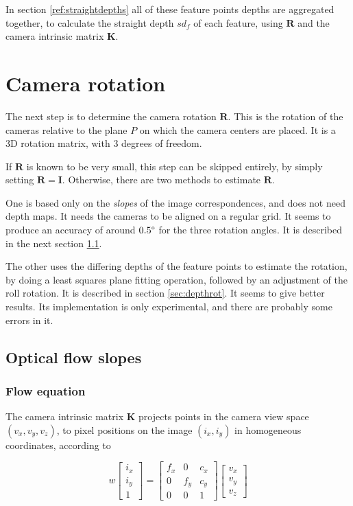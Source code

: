\documentclass{scrreprt}
\newcommand{\matr}[1]{\mathbf{#1}}
\newcommand{\degr}{\text{\textdegree}}
\begin{document}
In section \ref{ref:straightdepths} all of these feature points depths are aggregated together, to calculate the straight depth $sd_f$ of each feature, using $\matr{R}$ and the camera intrinsic matrix $\matr{K}$.


\pagebreak
\section{Camera rotation}
\label{sec:camrotation}
The next step is to determine the camera rotation $\matr{R}$. This is the rotation of the cameras relative to the plane $P$ on which the camera centers are placed. It is a 3D rotation matrix, with 3 degrees of freedom.

If $\matr{R}$ is known to be very small, this step can be skipped entirely, by simply setting $\matr{R} = \matr{I}$. Otherwise, there are two methods to estimate $\matr{R}$.

One is based only on the \emph{slopes} of the image correspondences, and does not need depth maps. It needs the cameras to be aligned on a regular grid. It seems to produce an accuracy of around $0.5\degr$ for the three rotation angles. It is described in the next section \ref{sec:sloperot}.

The other uses the differing depths of the feature points to estimate the rotation, by doing a least squares plane fitting operation, followed by an adjustment of the roll rotation. It is described in section \ref{sec:depthrot}. It seems to give better results. Its implementation is only experimental, and there are probably some errors in it.


\subsection{Optical flow slopes}
\label{sec:sloperot}

\subsubsection{Flow equation}
The camera intrinsic matrix $\matr{K}$ projects points in the camera view space $(v_x, v_y, v_z)$, to pixel positions on the image $(i_x, i_y)$ in homogeneous coordinates, according to

\begin{equation}
w \begin{bmatrix}
	i_x \\ i_y \\ 1
\end{bmatrix}
= \begin{bmatrix}
	f_x & 0 & c_x \\
	0 & f_y & c_y \\
	0 & 0 & 1
\end{bmatrix}
\begin{bmatrix}
	v_x \\ v_y \\ v_z
\end{bmatrix}
\end{equation}
\end{document}
